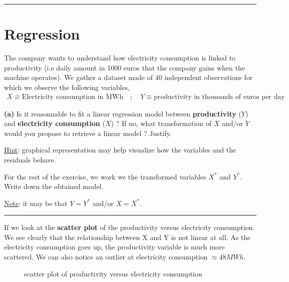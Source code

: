 \documentclass[10pt, a4paper, nofootinbib]{scrartcl}
\begin{document}
\begin{center}\rule{6cm}{0.4pt}\end{center}

\section{Regression}

The company wants to understand how electricity consumption is linked to productivity (i.e daily amount in 1000 euros that the company gains when the machine operates). We gather a dataset made of $40$ independent observations for which we observe the following variables,
\begin{equation}
  \begin{array}{rl}
    X \equiv \text{Electricity consumption in MWh} \quad ; \quad Y \equiv \text{productivity in thousands of euros per day}
  \end{array}
\end{equation}

\textbf{(a)} Is it reasonnable to fit a linear regression model between \textbf{productivity} ($Y$) and \textbf{electricity consumption} ($X$) ? 
If no, what transformation of $X$ and/or $Y$ would you propose to retrieve a linear model ? Justify.

\underline{Hint}: graphical representation may help visualize how the variables and the residuals behave.

For the rest of the exercise, we work we the transformed variables $X^{\ast}$ and $Y^{\ast}$. 
Write down the obtained model.

\underline{Note}: it may be that $Y = Y^{\ast}$ and/or $X = X^{\ast}$.

\begin{center}\rule{6cm}{0.4pt}\end{center}

If we look at the \textbf{scatter plot} of the productivity versus electricity consumption. We see clearly that the relationship between X and Y is not linear at all. As the electricity consumption goes up, the productivity variable is much more scattered. We can also notice an outlier at electricity consumption $\approx 48MWh$.

\begin{figure}[H]
  \centering
  
  \caption{scatter plot of productivity versus electricity consumption}
  \label{fig:scatter_plot}
\end{figure}
\end{document}
